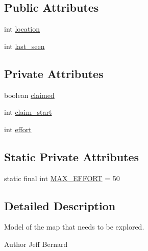 \subsection*{Public Attributes}
\begin{DoxyCompactItemize}
\item 
int \hyperlink{classai_1_1general_1_1_general_a_i_exploration_a05b90a2f5718f73880624f2013c1bb05}{location}
\item 
int \hyperlink{classai_1_1general_1_1_general_a_i_exploration_a8cc7f9509b921afbcf4ede4964476316}{last\_\-seen}
\end{DoxyCompactItemize}
\subsection*{Private Attributes}
\begin{DoxyCompactItemize}
\item 
boolean \hyperlink{classai_1_1general_1_1_general_a_i_exploration_abdd49604e2c3c40dc7d8fdc830a608e2}{claimed}
\item 
int \hyperlink{classai_1_1general_1_1_general_a_i_exploration_ae2aa8a6bcd54043e3b99c0900028ade1}{claim\_\-start}
\item 
int \hyperlink{classai_1_1general_1_1_general_a_i_exploration_a8e960c790a7b8d63841a7e2eedea9f85}{effort}
\end{DoxyCompactItemize}
\subsection*{Static Private Attributes}
\begin{DoxyCompactItemize}
\item 
static final int \hyperlink{classai_1_1general_1_1_general_a_i_exploration_a20679f76ebc301269b9426537cbc4dc7}{MAX\_\-EFFORT} = 50
\end{DoxyCompactItemize}


\subsection{Detailed Description}
Model of the map that needs to be explored. 

\begin{DoxyAuthor}{Author}
Jeff Bernard 
\end{DoxyAuthor}


